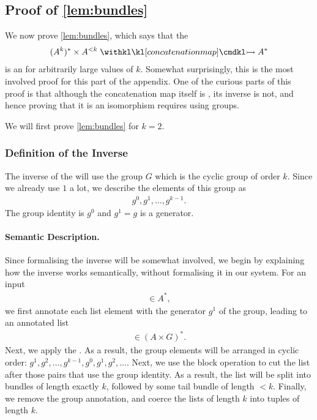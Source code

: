 \subsection{Proof of \cref{lem:bundles}}
\label{sec:proof-of-bundles}

\newcommand{\binrep}{\twotype^*}
\newcommand{\bundle}[2][A]{(#1^{#2})^* \times #1^{<#2}}
\newcommand{\encterm}{\mathtt{enc}}
\newcommand{\decterm}{\mathtt{dec}}

We now prove \cref{lem:bundles}, which says that the 
\begin{align*}
    \bundle[A]{k}\concmap  A^*
\end{align*}
is  an  for arbitrarily large values of $k$. Somewhat surprisingly, this is the most involved  proof for  this part of the appendix. One of the curious parts of this proof is that although the concatenation map itself is , its inverse is not, and hence proving that it is an isomorphism requires using groups.

We will first prove \cref{lem:bundles} for $k=2$.

\subsubsection{Definition of the Inverse}
\label{sec:inverse-definition}
The inverse of the   will use
the group $G$ which is the cyclic group of order $k$. Since we already use $1$ a lot, we  describe the elements of this group as
\begin{align*}
    g^{0}, g^1, \ldots, g^{k-1}.
\end{align*}
The group identity is $g^0$ and $g^1=g$ is a generator.


\paragraph*{Semantic Description.}  Since formalising the inverse will be somewhat involved, we begin by explaining how the inverse works semantically, without formalising it in our system.
For an input
\begin{align*}
    [a_1,\ldots,a_n] \in A^*,
\end{align*}
we first annotate each list element with the generator $g^1$  of the group,
leading to an annotated list
\begin{align*}
    [(a_1,g^1),\ldots,(a_n,g^1)] \in (A \times G)^*.
\end{align*}
Next, we apply the . As a result, the group elements will be arranged in cyclic order: $g^1,g^2,\ldots,g^{k-1},g^0,g^1,g^2,\ldots$. Next, we use the block operation to cut the list after those pairs that use the group identity. As a result, the list will be split into bundles of length exactly $k$, followed by some tail bundle of length $< k$. Finally, we  remove the group annotation, and coerce the lists of length $k$ into tuples of length $k$.

